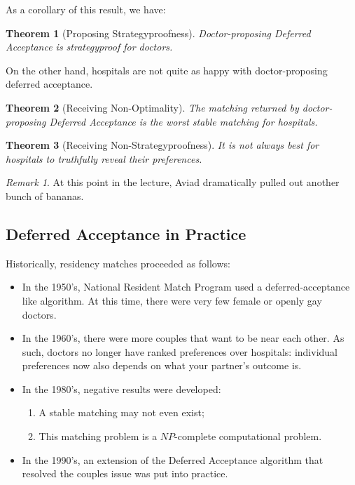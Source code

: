 \documentclass[dvipsnames]{article}
\newtheorem{theorem}{Theorem}[section]
\theoremstyle{definition}
\theoremstyle{remark}
\newtheorem*{remark}{Remark}
\begin{document}
As a corollary of this result, we have:

\begin{theorem}[Proposing Strategyproofness]
	Doctor-proposing Deferred Acceptance is strategyproof for doctors. 
\end{theorem}

On the other hand, hospitals are not quite as happy with doctor-proposing deferred acceptance. 

\begin{theorem}[Receiving Non-Optimality]
	The matching returned by doctor-proposing Deferred Acceptance is the worst stable matching for hospitals. 
\end{theorem}

\begin{theorem}[Receiving Non-Strategyproofness]
	It is not always best for hospitals to truthfully reveal their preferences. 
\end{theorem}

\begin{remark}
	At this point in the lecture, Aviad dramatically pulled out another bunch of bananas.
\end{remark}

\subsection{Deferred Acceptance in Practice}

Historically, residency matches proceeded as follows:
\begin{itemize}
	\item In the 1950's, National Resident Match Program used a deferred-acceptance like algorithm. At this time, there were very few female or openly gay doctors.
	\item In the 1960's, there were more couples that want to be near each other. As such, doctors no longer have ranked preferences over hospitals: individual preferences now also depends on what your partner's outcome is.
	\item In the 1980's, negative results were developed: 
	\begin{enumerate}
		\item A stable matching may not even exist;
		\item This matching problem is a $NP$-complete computational problem.
	\end{enumerate}
	\item In the 1990's, an extension of the Deferred Acceptance algorithm that resolved the couples issue was put into practice. 
\end{itemize}
\end{document}
